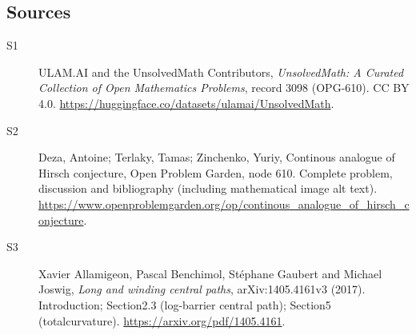 \documentclass[11pt]{book}
\begin{document}
\subsection{Sources}
\begin{description}
\item[\hypertarget{source:3098:1}{S1}] ULAM.AI and the UnsolvedMath Contributors, \emph{UnsolvedMath: A Curated Collection of Open Mathematics Problems}, record 3098 (OPG-610). CC BY 4.0. \url{https://huggingface.co/datasets/ulamai/UnsolvedMath}.
\item[\hypertarget{source:3098:2}{S2}] Deza, Antoine; Terlaky, Tamas; Zinchenko, Yuriy, Continous analogue of Hirsch conjecture, Open Problem Garden, node 610. Complete problem, discussion and bibliography (including mathematical image alt text). \url{https://www.openproblemgarden.org/op/continous_analogue_of_hirsch_conjecture}.
\item[\hypertarget{source:3098:3}{S3}] Xavier Allamigeon, Pascal Benchimol, Stéphane Gaubert and Michael Joswig, \emph{Long and winding central paths}, arXiv:1405.4161v3 (2017). Introduction; Section2.3 (log-barrier central path); Section5 (totalcurvature). \url{https://arxiv.org/pdf/1405.4161}.
\end{description}
\label{end:3098}
\end{document}
